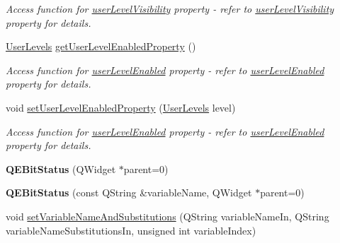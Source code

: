 \begin{DoxyCompactItemize}
\begin{DoxyCompactList}\small\item\em Access function for \hyperlink{classQEBitStatus_af9179749c38691f33cdcf1f8de7d3e3d}{userLevelVisibility} property -\/ refer to \hyperlink{classQEBitStatus_af9179749c38691f33cdcf1f8de7d3e3d}{userLevelVisibility} property for details. \end{DoxyCompactList}\item 
\hypertarget{classQEBitStatus_a8caff667457286a160b3f8e30d3cdfdc}{
\hyperlink{classQEBitStatus_a3b7b2b21622eff585577c6ab1b90b5ed}{UserLevels} \hyperlink{classQEBitStatus_a8caff667457286a160b3f8e30d3cdfdc}{getUserLevelEnabledProperty} ()}
\label{classQEBitStatus_a8caff667457286a160b3f8e30d3cdfdc}

\begin{DoxyCompactList}\small\item\em Access function for \hyperlink{classQEBitStatus_aaf35e62560528034f4d2dd67256c5fba}{userLevelEnabled} property -\/ refer to \hyperlink{classQEBitStatus_aaf35e62560528034f4d2dd67256c5fba}{userLevelEnabled} property for details. \end{DoxyCompactList}\item 
\hypertarget{classQEBitStatus_a94863bd6153388d65ea47dd0957ebc0b}{
void \hyperlink{classQEBitStatus_a94863bd6153388d65ea47dd0957ebc0b}{setUserLevelEnabledProperty} (\hyperlink{classQEBitStatus_a3b7b2b21622eff585577c6ab1b90b5ed}{UserLevels} level)}
\label{classQEBitStatus_a94863bd6153388d65ea47dd0957ebc0b}

\begin{DoxyCompactList}\small\item\em Access function for \hyperlink{classQEBitStatus_aaf35e62560528034f4d2dd67256c5fba}{userLevelEnabled} property -\/ refer to \hyperlink{classQEBitStatus_aaf35e62560528034f4d2dd67256c5fba}{userLevelEnabled} property for details. \end{DoxyCompactList}\item 
\hypertarget{classQEBitStatus_a9a94df1bdc0bcae7929b39c83403c3cb}{
{\bfseries QEBitStatus} (QWidget $\ast$parent=0)}
\label{classQEBitStatus_a9a94df1bdc0bcae7929b39c83403c3cb}

\item 
\hypertarget{classQEBitStatus_a583826f9374a8bf21a804d17cafbb98e}{
{\bfseries QEBitStatus} (const QString \&variableName, QWidget $\ast$parent=0)}
\label{classQEBitStatus_a583826f9374a8bf21a804d17cafbb98e}

\item 
void \hyperlink{classQEBitStatus_acb5b1d97dca3db6081ad4f10717fe2e6}{setVariableNameAndSubstitutions} (QString variableNameIn, QString variableNameSubstitutionsIn, unsigned int variableIndex)
\end{DoxyCompactItemize}
